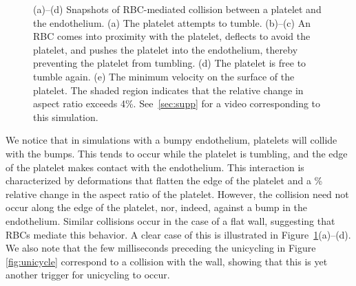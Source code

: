 \begin{figure}[th!]
    \vspace{11pt}

    \begin{subfigure}[t]{\textwidth}
    \end{subfigure}
    \caption[RBC-mediated platelet-endothelial collision]{%
(a)--(d) Snapshots of RBC-mediated collision between a platelet and the endothelium. (a)
The platelet attempts to tumble. (b)--(c) An RBC comes into proximity with the platelet,
deflects to avoid the platelet, and pushes the platelet into the endothelium, thereby
preventing the platelet from tumbling. (d) The platelet is free to tumble again. (e) The
minimum velocity on the surface of the platelet. The shaded region indicates that the
relative change in aspect ratio exceeds 4\%. See~\ref{sec:supp} for a video corresponding
to this simulation.
    }\label{fig:rbc-plt-endo-collision}
\end{figure}

We notice that in simulations with a bumpy endothelium, platelets will collide with the
bumps. This tends to occur while the platelet is tumbling, and the edge of the platelet
makes contact with the endothelium. This interaction is characterized by deformations
that flatten the edge of the platelet and a \% relative
change in the aspect ratio of the platelet. However, the collision need not occur along
the edge of the platelet, nor, indeed, against a bump in the endothelium. Similar
collisions occur in the case of a flat wall, suggesting that RBCs mediate this behavior.
A clear case of this is illustrated in Figure~\ref{fig:rbc-plt-endo-collision}(a)--(d).
We also note that the few milliseconds preceding the unicycling in Figure~%
\ref{fig:unicycle} correspond to a collision with the wall, showing that this is yet
another trigger for unicycling to occur.

